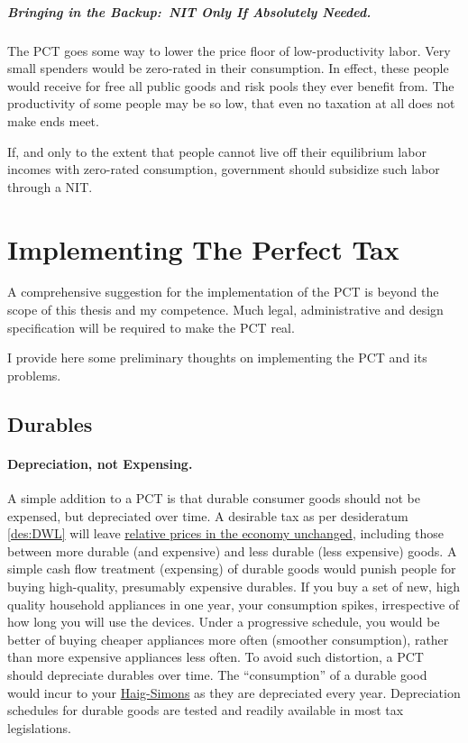 \subparagraph{Bringing in the Backup:~NIT Only If Absolutely Needed.}
The PCT goes some way to lower the price floor of low-productivity labor.
Very small spenders would be zero-rated in their consumption.
In effect, these people would receive for free all public goods and risk pools they ever benefit from.
The productivity of some people may be so low, that even no taxation at all does not make ends meet.

If, and only to the extent that people cannot live off their equilibrium labor incomes with zero-rated consumption, government should subsidize such labor through a NIT.

\section{Implementing The Perfect Tax}
	\label{sec:Implementation}
A comprehensive suggestion for the implementation of the PCT is beyond the scope of this thesis and my competence.
Much legal, administrative and design specification will be required to make the PCT real.

I provide here some preliminary thoughts on implementing the PCT and its problems.

\subsection{Durables}

\paragraph{Depreciation, not Expensing.}
A simple addition to a PCT is that durable consumer goods should not be expensed, but depreciated over time.
A desirable tax as per desideratum \ref{des:DWL} will leave \hyperref[des:DWL]{relative prices in the economy unchanged}, including those between more durable (and expensive) and less durable (less expensive) goods.
A simple cash flow treatment (expensing) of durable goods would punish people for buying high-quality, presumably expensive durables.
If you buy a set of new, high quality household appliances in one year, your consumption spikes, irrespective of how long you will use the devices.
Under a progressive schedule, you would be better of buying cheaper appliances more often (smoother consumption), rather than more expensive appliances less often.
To avoid such distortion, a PCT should depreciate durables over time.
The ``consumption'' of a durable good would incur to your \hyperref[eq:HaigSimonsPCT]{Haig-Simons} as they are depreciated every year.
Depreciation schedules for durable goods are tested and readily available in most tax legislations.

